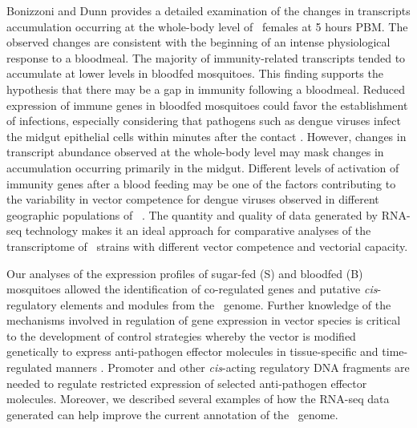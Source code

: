 Bonizzoni and Dunn \cite{Bonizzoni2011} provides a detailed examination of the changes in transcripts accumulation occurring at the whole-body level of \Aa\  females at 5 hours \gls{PBM}. The observed changes are consistent with the beginning of an intense physiological response to a bloodmeal. The majority of immunity-related transcripts tended to accumulate at lower levels in bloodfed mosquitoes. This finding supports the hypothesis that there may be a gap in immunity following a bloodmeal. Reduced expression of immune genes in bloodfed mosquitoes could favor the establishment of infections, especially considering that pathogens such as dengue viruses infect the midgut epithelial cells within minutes after the contact \cite{Salazar2007}. However, changes in transcript abundance observed at the whole-body level may mask changes in accumulation occurring primarily in the midgut. Different levels of activation of immunity genes after a blood feeding may be one of the factors contributing to the variability in vector competence for dengue viruses observed in different geographic populations of \Aa\  \cite{Bennett2002,Black2002}. The quantity and quality of data generated by RNA-seq technology makes it an ideal approach for comparative analyses of the transcriptome of \Aa\ strains with different vector competence and vectorial capacity.

Our analyses of the expression profiles of sugar-fed (S) and bloodfed (B) mosquitoes allowed the identification of co-regulated genes and putative \textit{cis}-regulatory elements and modules from the \Aa\  genome. Further knowledge of the mechanisms involved in regulation of gene expression in vector species is critical to the development of control strategies whereby the vector is modified genetically to express anti-pathogen effector molecules in tissue-specific and time-regulated manners \cite{Terenius2008}. Promoter and other \textit{cis}-acting regulatory DNA fragments are needed to regulate restricted expression of selected anti-pathogen effector molecules. Moreover, we described several examples of how the RNA-seq data generated can help improve the current annotation of the \Aa\  genome.

